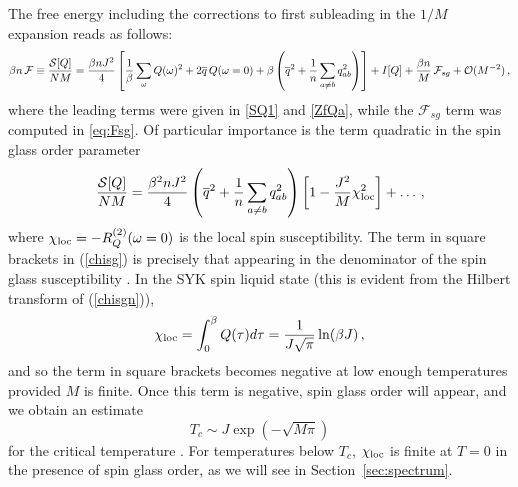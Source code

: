 \documentclass[aps,prx,preprint,onecolumn,citeautoscript,superscriptaddress,nofootinbib,
eqsecnum]{revtex4}
\newcommand{\beq}{\begin{equation}}
\newcommand{\eeq}{\end{equation}}
\begin{document}
{The free energy including the corrections to first subleading in the $1/M$ expansion reads as follows:
\begin{equation}
\beta n \,{\cal F} \equiv\frac{{\cal S}[Q]}{NM} = \frac{\beta n J^2}{4}  \left[\frac{1}{\beta} \sum_\omega Q(\omega)^2 + 2\overline{q} \, Q(\omega=0) + \beta \left( \overline{q}^2 + \frac{1}{n} \sum_{a\neq b} q_{ab}^2 \right)\right]  + I[Q] + \frac{\beta n}{M} \, {\cal F}_{sg} + {\cal O}(M^{-2}) \,,
\end{equation}
where the leading terms were given in \eqref{SQ1} and \eqref{ZfQa}, while the $\mathcal{F}_{sg}$ term was computed in \eqref{eq:Fsg}. Of particular importance is the term quadratic in the spin glass order parameter
\beq
\frac{{\cal S}[Q]}{NM} = \frac{\beta^2 n J^2}{4}\left( \overline{q}^2 + \frac{1}{n} \sum_{a\neq b} q_{ab}^2 \right) \left[ 1 - \frac{J^2}{M} \chi_{\rm loc}^2 \right] + \ldots\,, \label{chisg}
\eeq
where $\chi_{\rm loc} =  - R_Q^{(2)}(\omega=0)$ is the local spin susceptibility. The term in square brackets in (\ref{chisg}) is precisely that appearing in the denominator of the spin glass susceptibility \cite{GPS01}. In the SYK spin liquid state \cite{SY92} (this is evident from the Hilbert transform of (\ref{chisgn})), 
\beq
\chi_{\rm loc} = \int_0^\beta Q(\tau) d \tau = \frac{1}{ J \sqrt{\pi}} \ln (\beta J) \,, \label{chiloc1}
\eeq
 and so the term in square brackets becomes negative at low enough temperatures provided $M$ is finite. Once this term is negative, spin glass order will appear, and we obtain an estimate 
 \beq
 T_c \sim J \exp \left(- \sqrt{M \pi} \right) 
 \label{Tc}
 \eeq
 for the critical temperature \cite{GPS01}. For temperatures below $T_c$, $\chi_{\rm loc}$ is finite at $T=0$ in the presence of spin glass order, as we will see in Section~\ref{sec:spectrum}.

}
\end{document}
